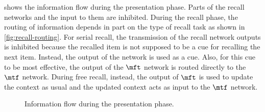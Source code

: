  shows the information flow during the presentation phase.
Parts of the recall networks and the input to them are inhibited.
During the recall phase, the routing of information depends in part on the type of recall task as shown in \cref{fig:recall-routing}.
For serial recall, the transmission of the recall network outputs is inhibited because the recalled item is not supposed to be a cue for recalling the next item.
Instead, the output of the  network is used as a cue.
Also, for this cue to be most effective, the output of the $\mft$ network is routed directly to the $\mtf$ network.
During free recall, instead, the output of $\mft$ is used to update the context as usual and the updated context acts as input to the $\mtf$ network.
\begin{figure}
    \centering
    \caption{Information flow during the presentation phase.}\label{fig:pres-routing}
\end{figure}
